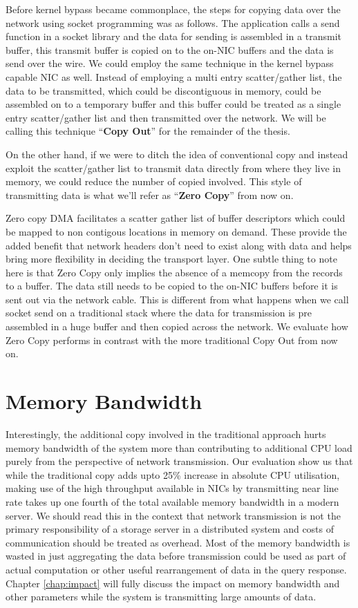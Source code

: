 Before kernel bypass became commonplace, the steps for copying data over the network using socket programming was as follows. 
The application calls a send function in a socket library and the data for sending is assembled 
in a transmit buffer, this transmit buffer is copied on to the on-NIC buffers and the data is 
send over the wire. We could employ the same technique in the kernel bypass capable NIC as well.
Instead of employing a multi entry scatter/gather list, the data to be transmitted, which could be discontiguous in memory, could be assembled on 
to a temporary buffer and this buffer could be treated as a single entry scatter/gather list
and then transmitted over the network. We will be calling this technique \enquote{\textbf{Copy Out}} for the remainder of the thesis. 

On the other hand, if we were to ditch the idea of conventional copy and instead exploit the scatter/gather list to 
transmit data directly from where they live in memory, we could reduce the number of copied involved. This style of transmitting data is 
what we'll refer as \enquote{\textbf{Zero Copy}} from now on.



Zero copy DMA facilitates a scatter gather list of buffer descriptors
which could be mapped to non contigous locations in memory on demand. These provide
the added benefit that network headers don't need to exist along with data and helps bring more flexibility 
in deciding the transport layer. One subtle thing to note here is that Zero Copy only implies the absence 
of a memcopy from the records to a buffer. The data still needs to be copied to the on-NIC buffers before 
it is sent out via the network cable. This is different from what happens when we call socket send on a traditional stack where the data for transmission is pre assembled in a huge buffer and then copied across the network.
We evaluate how Zero Copy performs in contrast with the more traditional Copy Out from now on.

\section{Memory Bandwidth}
Interestingly, the additional copy involved in the traditional approach hurts memory bandwidth of the system more than contributing 
to additional CPU load purely from the perspective of network transmission. Our evaluation show us that while the traditional
copy adds upto 25\% increase in absolute CPU utilisation, making use of the high throughput available in NICs by transmitting
near line rate takes up one fourth of the total available memory bandwidth in a modern server. We should read this in the context that 
network transmission is not the primary responsibility of a storage server in a distributed system and costs of communication should be treated as overhead.
 Most of the memory bandwidth is wasted in just aggregating the data before transmission could be used as part of actual computation or other useful rearrangement of data in 
the query response. Chapter \ref{chap:impact} will fully discuss the impact on memory bandwidth and other parameters while the system 
is transmitting large amounts of data.


